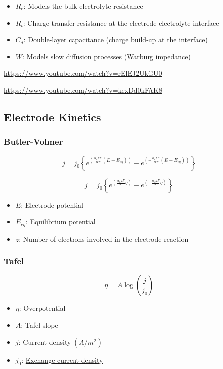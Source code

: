 \documentclass[
  letterpaper,
  DIV=11,
  numbers=noendperiod]{scrartcl}
\providecommand{\tightlist}{%
  \setlength{\itemsep}{0pt}\setlength{\parskip}{0pt}}
\begin{document}
\begin{itemize}
\tightlist
\item
  \(R_e\): Models the bulk electrolyte resistance
\item
  \(R_t\): Charge transfer resistance at the electrode-electrolyte
  interface
\item
  \(C_d\): Double-layer capacitance (charge build-up at the interface)
\item
  \(W\): Models slow diffusion processes (Warburg impedance)
\end{itemize}

\url{https://www.youtube.com/watch?v=rElEJ2UkGU0}

\url{https://www.youtube.com/watch?v=kexDd0kFAK8}

\subsection{Electrode Kinetics}\label{electrode-kinetics}

\subsubsection{Butler-Volmer}\label{butler-volmer}

\[
j = j_0 \left\{e^{\left(\frac{\alpha_a z F}{RT}(E-E_{eq})\right)} - e^{\left(-\frac{\alpha_c z F}{RT}(E-E_{eq})\right)}\right\}
\]

\[
j = j_0 \left\{e^{\left(\frac{\alpha_a z F}{RT}\eta\right)} - e^{\left(-\frac{\alpha_c z F}{RT}\eta\right)}\right\}
\]

\begin{itemize}
\tightlist
\item
  \(E\): Electrode potential
\item
  \(E_{eq}\): Equilibrium potential
\item
  \(z\): Number of electrons involved in the electrode reaction
\end{itemize}

\subsubsection{Tafel}\label{tafel}

\[
\eta = A \log\left(\frac{j}{j_0}\right)
\]

\begin{itemize}
\tightlist
\item
  \(\eta\): Overpotential
\item
  \(A\): Tafel slope
\item
  \(j\): Current density \((A/m^2)\)
\item
  \(j_0\):
  \href{https://en.wikipedia.org/wiki/Exchange_current_density}{Exchange
  current density}
\end{itemize}
\end{document}
